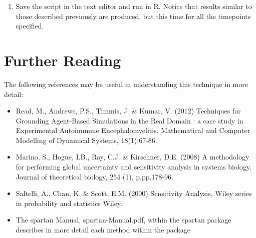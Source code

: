 \documentclass[a4paper,11pt]{article}
\begin{document}
\begin{enumerate}
\item Save the script in the text editor and run in R.  Notice that results similar to those described previously are produced, but this time for all the timepoints specified.

\end{enumerate}

\section{Further Reading}
\noindent
The following references may be useful in understanding this technique in more detail:
\begin{itemize}
\item Read, M., Andrews, P.S., Timmis, J. \& Kumar, V. (2012) Techniques for Grounding Agent-Based Simulations in the Real Domain : a case study in Experimental Autoimmune Encephalomyelitis. Mathematical and Computer Modelling of Dynamical Systems, 18(1):67-86.
\item Marino, S., Hogue, I.B., Ray, C.J. \& Kirschner, D.E. (2008) A methodology for performing global uncertainty and sensitivity analysis in systems biology. Journal of theoretical biology, 254 (1), p.pp.178-96.
\item Saltelli, A., Chan, K. \& Scott, E.M. (2000) Sensitivity Analysis, Wiley series in probability and statistics Wiley.
\item The spartan Manual, spartan-Manual.pdf, within the spartan package describes in more detail each method within the package
\end{itemize}
\end{document}
